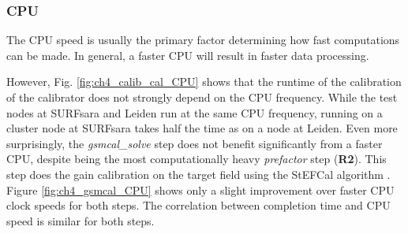 \subsubsection{CPU}
The CPU speed is usually the primary factor determining how fast computations can be made. In general, a faster CPU will result in faster data processing. 

However, Fig. \ref{fig:ch4_calib_cal_CPU} shows that the runtime of the calibration of the calibrator does not strongly depend on the CPU frequency. While the test nodes at SURFsara and Leiden run at the same CPU frequency, running on a cluster node at SURFsara takes half the time as on a node at Leiden. Even more surprisingly, the \textit{gsmcal\_solve} step does not benefit significantly from a faster CPU, despite being the most computationally heavy \textit{prefactor} step (\textbf{R2}). This step does the gain calibration on the target field using the StEFCal algorithm \citep{stefcal}. Figure \ref{fig:ch4_gsmcal_CPU} shows only a slight improvement over faster CPU clock speeds for both steps. The correlation between completion time and CPU speed is similar for both steps.

